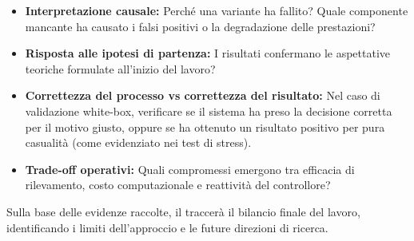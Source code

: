 \begin{itemize}
    \item \textbf{Interpretazione causale:} Perché una variante ha fallito? Quale componente mancante ha causato i falsi positivi o la degradazione delle prestazioni?
    \item \textbf{Risposta alle ipotesi di partenza:} I risultati confermano le aspettative teoriche formulate all'inizio del lavoro?
    \item \textbf{Correttezza del processo vs correttezza del risultato:} Nel caso di validazione white-box, verificare se il sistema ha preso la decisione corretta per il motivo giusto, oppure se ha ottenuto un risultato positivo per pura casualità (come evidenziato nei test di stress).
    \item \textbf{Trade-off operativi:} Quali compromessi emergono tra efficacia di rilevamento, costo computazionale e reattività del controllore?
\end{itemize}

Sulla base delle evidenze raccolte, il  traccerà il bilancio finale del lavoro, identificando i limiti dell'approccio e le future direzioni di ricerca.
